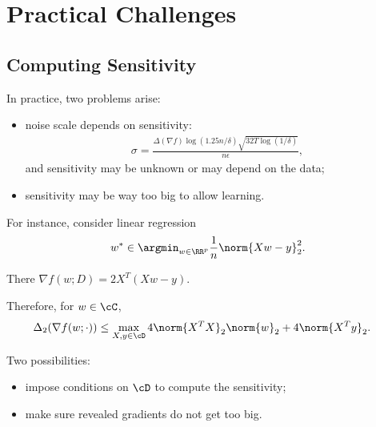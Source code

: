 \documentclass[notheorems]{beamer}
\begin{document}
\section{Practical Challenges}
\label{sec:practical_challenges}

\subsection{Computing Sensitivity}
\label{sub:computing_sensitivity}

\begin{frame}
  In practice, two problems arise:
  \begin{itemize}
  \item
    noise scale depends on sensitivity:
    \begin{align*}
      \sigma = \frac{\Delta(\nabla f) \log(1.25n/\delta)\sqrt{32T\log(1/\delta)}}{n\epsilon},
    \end{align*}
    and sensitivity may be unknown or may depend on the data;

    \vspace{1em}

  \item
    sensitivity may be way too big to allow learning.
  \end{itemize}
\end{frame}

\begin{frame}
  For instance, consider linear regression
  \begin{align*}
    w^* \in \argmin_{w\in\RR^p} \frac {1}{n} \norm{Xw - y}_2^2.
  \end{align*}

  There $\nabla f(w; D) = 2 X^T (Xw - y)$.

  \vspace{1em}

  Therefore, for $w \in \cC$,
  \begin{align*}
    \Delta_2(\nabla f(w; \cdot))
    & \le \max_{X,y\in \cD} 4 \norm{X^T X}_2 \norm{w}_2 + 4 \norm{X^T y}_2.
  \end{align*}
\end{frame}

\begin{frame}
  Two possibilities:
  \begin{itemize}
  \item impose conditions on $\cD$ to compute the sensitivity;
  \item make sure revealed gradients do not get too big.
  \end{itemize}
\end{frame}
\end{document}
